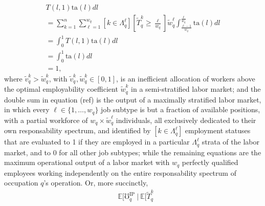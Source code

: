 \documentclass[hidelinks, nonatbib]{elsarticle}
\begin{document}
\begin{enumerate}
\begin{enumerate}
\begin{enumerate}
\begin{align}
{                    T(l,1)
                    \text{ta}(l)
                    dl
                }
                \\
                =
                \sum_{k=1}^{n}
                \sum_{\ell=1}^{w_q}
                \left[
                    k \in \Lambda_{q}^{\ell}
                \right]
                \left[
                    \tilde{T}_{q}^{k}
                    \geq 
                    \frac{\ell}{w_q}
                \right]
                \tilde{w}_{q}^{\ell}
                \int_{
                    \frac{\ell - 1}{w_q}
                }^{
                    \frac{\ell}{w_q}
                }{
                    \text{ta}(l)
                    dl
                }
                \\
                =
                \int_{0}^{1}{
                    T(l,1)
                    \text{ta}(l)
                    dl
                }
                \\
                =
                \int_{0}^{1}{
                    \text{ta}(l)
                    dl
                }
                \\
                =
                1
                ,
            \end{align}
            where $\tilde{v}_{q}^{k} > \tilde{w}_{q}^{k}$, with $\tilde{v}_{q}^{k}, \tilde{w}_{q}^{k} \in [0,1]$, is an inefficient allocation of workers above the optimal employability coefficient $\tilde{w}_{q}^{k}$ in a semi-stratified labor market; and the double sum in equation (ref) is the output of a maximally stratified labor market, in which every $\ell \in \{1, \dots, w_q\}$ job subtype is but a fraction of available positions, with a partial workforce of $w_q \times \tilde{w}_{q}^{\ell}$ individuals, all exclusively dedicated to their own responsability spectrum, and identified by $[k \in \Lambda_{q}^{\ell}]$ employment statuses that are evaluated to 1 if they are employed in a particular $\Lambda_{q}^{\ell}$ strata of the labor market, and to 0 for all other job subtypes; while the remaining equations are the maximum operational output of a labor market with $w_q$ perfectly qualified employees working independently on the entire responsability spectrum of occupation $q$'s operation. Or, more succinctly,
            \begin{align}
                &\mathbb{E}[
                    \mho_{q}^{\text{IP}}
                    \
                    |
                    \
                    \mathbb{E}[
                        \tilde{T}_{q}^{k}

\end{align}
\end{enumerate}
\end{enumerate}
\end{enumerate}
\end{document}
